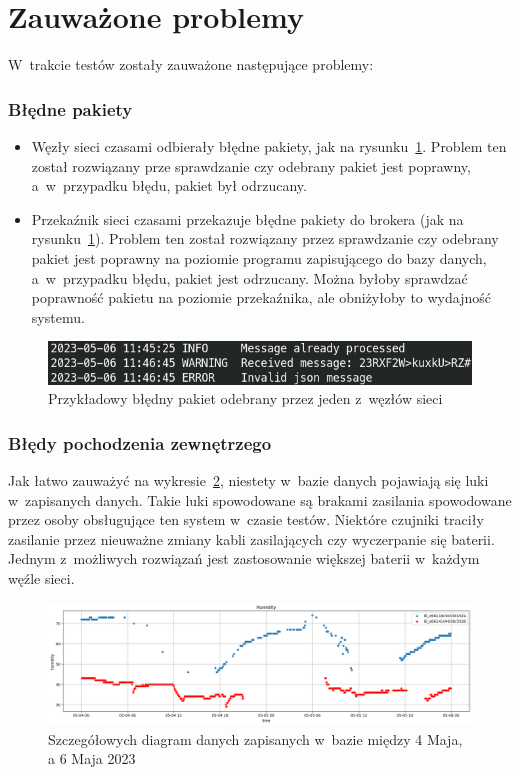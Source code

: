 \section{Zauważone problemy}
W~trakcie testów zostały zauważone następujące problemy:
\subsubsection{Błędne pakiety}
\begin{itemize}
    \item Węzły sieci czasami odbierały błędne pakiety, jak na rysunku~\ref{rys:zly-pakiet}. Problem ten został rozwiązany prze sprawdzanie czy odebrany pakiet jest poprawny, a~w~przypadku błędu, pakiet był odrzucany.
    \item Przekaźnik sieci czasami przekazuje błędne pakiety do brokera (jak na rysunku~\ref{rys:zly-pakiet}). Problem ten został rozwiązany przez sprawdzanie czy odebrany pakiet jest poprawny na poziomie programu zapisującego do bazy danych, a~w~przypadku błędu, pakiet jest odrzucany. Można byłoby sprawdzać poprawność pakietu na poziomie przekaźnika, ale obniżyłoby to wydajność systemu.
\end{itemize}

\begin{figure}[b!]
    \begin{center}
        \includegraphics[width=13cm]{pic/zly-pakiet.png}
    \end{center}
    \caption{Przykładowy błędny pakiet odebrany przez jeden z~węzłów sieci}\label{rys:zly-pakiet}
\end{figure}

\subsubsection{Błędy pochodzenia zewnętrzego}
Jak łatwo zauważyć na wykresie~\ref{rys:diagram-scat}, niestety w~bazie danych pojawiają się luki w~zapisanych danych.
Takie luki spowodowane są brakami zasilania spowodowane przez osoby obsługujące ten system w~czasie testów.
Niektóre czujniki traciły zasilanie przez nieuważne zmiany kabli zasilających czy wyczerpanie się baterii.
Jednym z~możliwych rozwiązań jest zastosowanie większej baterii w~każdym węźle sieci.

\begin{figure}[b!]
    \begin{center}
        \includegraphics[width=13cm]{pic/diagram-scat-humm.png}
    \end{center}
    \caption{Szczegółowych diagram danych zapisanych w~bazie między 4 Maja, a 6 Maja 2023}\label{rys:diagram-scat}
\end{figure}

